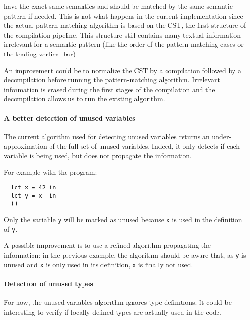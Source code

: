 \documentclass[10pt,a4paper]{article}
\begin{document}
have the exact same semantics and should be matched by the same
semantic pattern if needed.  This is not what happens in the current
implementation since the actual pattern-matching algorithm is based on
the CST, the first structure of the compilation pipeline. This
structure still contains many textual information irrelevant for a
semantic pattern (like the order of the pattern-matching cases or the
leading vertical bar).

An improvement could be to normalize the CST by a compilation followed
by a decompilation before running the pattern-matching
algorithm. Irrelevant information is erased during the first stages of
the compilation and the decompilation allows us to run the existing
algorithm.

\paragraph{A better detection of unused variables}

The current algorithm used for detecting unused variables returns an
under-approximation of the full set of unused variables. Indeed, it
only detects if each variable is being used, but does not propagate
the information.

For example with the program:
\begin{verbatim}
  let x = 42 in
  let y = x  in
  ()
\end{verbatim}

Only the variable \verb|y| will be marked as unused because
\verb|x| is used in the definition of \verb|y|.

A possible improvement is to use a refined algorithm propagating the
information: in the previous example, the algorithm should be aware
that, as \verb|y| is unused and \verb|x| is only used in its
definition, \verb|x| is finally not used.

\paragraph{Detection of unused types}

For now, the unused variables algorithm ignores type definitions. It
could be interesting to verify if locally defined types are actually
used in the code.
\end{document}

